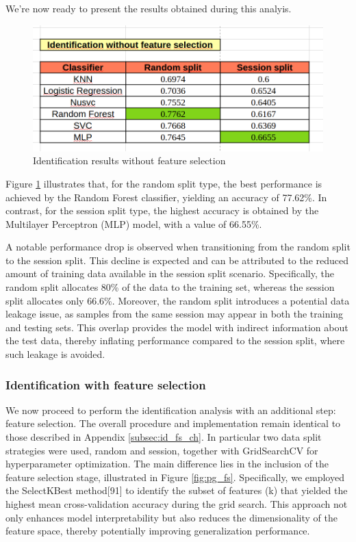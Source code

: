 \documentclass{article}
\begin{document}
We're now ready to present the results obtained during this analyis.

\begin{figure}[ht]
    \centering
    \includegraphics[width = 0.6
    \textwidth]{Images/Results/Identification/nofs.png}
    \caption{Identification results without feature selection}
    \label{fig:id_nofs}
\end{figure}

Figure \ref{fig:id_nofs} illustrates that, for the random split type, the best performance is achieved by the Random Forest classifier, yielding an accuracy of 77.62\%.
In contrast, for the session split type, the highest accuracy is obtained by the Multilayer Perceptron (MLP) model, with a value of 66.55\%.

A notable performance drop is observed when transitioning from the random split to the session split. 
This decline is expected and can be attributed to the reduced amount of training data available in the session split scenario. 
Specifically, the random split allocates 80\% of the data to the training set, whereas the session split allocates only 66.6\%.
Moreover, the random split introduces a potential data leakage issue, as samples from the same session may appear in both the training and testing sets. 
This overlap provides the model with indirect information about the test data, thereby inflating performance compared to the session split, where such leakage is avoided.
\FloatBarrier

\subsubsection{Identification with feature selection}

We now proceed to perform the identification analysis with an additional step: feature selection.
The overall procedure and implementation remain identical to those described in Appendix \ref{subsec:id_fs_ch}.
In particular two data split strategies were used, random and session, together with GridSearchCV for hyperparameter optimization.
The main difference lies in the inclusion of the feature selection stage, illustrated in Figure \ref{fig:pg_fs}. 
Specifically, we employed the SelectKBest method[91] to identify the subset of features (k) that yielded the highest mean cross-validation accuracy during the grid search.
This approach not only enhances model interpretability but also reduces the dimensionality of the feature space, thereby potentially improving generalization performance.
\end{document}
